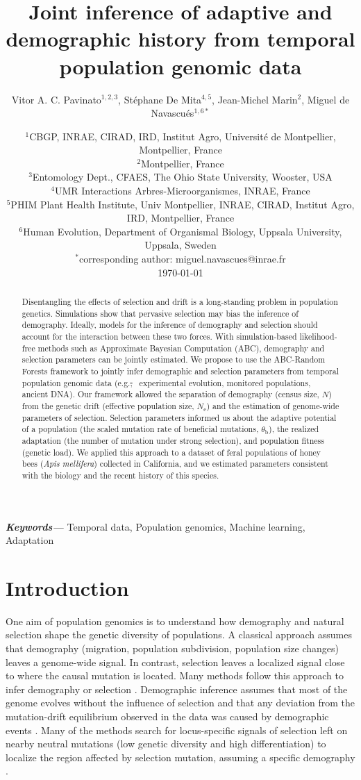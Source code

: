 \documentclass[a4paper, 12pt]{article}
\title{Joint inference of adaptive and demographic history from temporal population genomic data}
\author{\small
            Vitor A. C. Pavinato$^{1,2,3}$, Stéphane De Mita$^{4,5}$, Jean-Michel Marin$^{2}$, Miguel de Navascués$^{1,6*}$}
\date{{\footnotesize %
    $^{1}$CBGP, INRAE, CIRAD, IRD, Institut Agro, Université de Montpellier, Montpellier, France\\%
    $^{2}$\DIFdelbegin \DIFdel{UMR Institut Montpelliérain Alexander Grothendieck, Université de }\DIFdelend \DIFaddbegin \DIFadd{IMAG, Univ Montpellier, CNRS, UMR 5149, }\DIFaddend Montpellier, France  \\%
    $^{3}$Entomology Dept., CFAES, The Ohio State University, Wooster, USA\\%
    $^{4}$UMR Interactions Arbres-Microorganismes, INRAE, France \\%
    $^{5}$PHIM Plant Health Institute, Univ Montpellier, INRAE, CIRAD, Institut Agro, IRD, Montpellier, France\\%
    $^{6}$Human Evolution, Department of Organismal Biology, Uppsala University, Uppsala, Sweden\\%
    $^{*}$corresponding author: miguel.navascues@inrae.fr\\[2ex]%
    }
    \footnotesize\today    
}
\providecommand{\keywords}[1]
{
  \small	
  \textbf{\textit{Keywords---}} #1
}
\providecommand{\DIFdeltex}[1]{{\protect\color{red}\sout{#1}}}                      %
\providecommand{\DIFdelbegin}{} %
\providecommand{\DIFdelend}{} %
\providecommand{\DIFdel}[1]{\texorpdfstring{\DIFdeltex{#1}}{}} %
\newcommand{\DIFscaledelfig}{0.5}
\newlength{\DIFdelgraphicswidth} %
\newlength{\DIFdelgraphicsheight} %
\newcommand{\DIFdelincludegraphics}[2][]{%
\sbox{\DIFdelgraphicsbox}{\DIFOincludegraphics[#1]{#2}}%
\settoboxwidth{\DIFdelgraphicswidth}{\DIFdelgraphicsbox} %
\settoboxtotalheight{\DIFdelgraphicsheight}{\DIFdelgraphicsbox} %
\scalebox{\DIFscaledelfig}{%
\parbox[b]{\DIFdelgraphicswidth}{\usebox{\DIFdelgraphicsbox}\\[-\baselineskip] \rule{\DIFdelgraphicswidth}{0em}}\llap{\resizebox{\DIFdelgraphicswidth}{\DIFdelgraphicsheight}{%
\setlength{\unitlength}{\DIFdelgraphicswidth}%
\begin{picture}(1,1)%
\thicklines\linethickness{2pt} %
{\color[rgb]{1,0,0}\put(0,0){\framebox(1,1){}}}%
{\color[rgb]{1,0,0}\put(0,0){\line( 1,1){1}}}%
{\color[rgb]{1,0,0}\put(0,1){\line(1,-1){1}}}%
\end{picture}%
}\hspace*{3pt}}} %
} %
\DeclareRobustCommand{\DIFdelbegin}{\DIFOdelbegin \let\includegraphics\DIFdelincludegraphics} %
\DeclareRobustCommand{\DIFdelend}{\DIFOaddend \let\includegraphics\DIFOincludegraphics} %
\begin{document}
\maketitle

\begin{abstract}
Disentangling the effects of selection and drift is a long-standing problem in population genetics. Simulations show that pervasive selection may bias the inference of demography. Ideally, models for the inference of demography and selection should account for the interaction between these two forces. With simulation-based likelihood-free methods such as Approximate Bayesian Computation (ABC), demography and selection parameters can be jointly estimated. We propose to use the ABC-Random Forests framework to jointly infer demographic  and selection parameters from temporal population genomic data (e.g.\DIFdelbegin \DIFdel{, }\DIFdelend \ experimental evolution, monitored populations, ancient DNA). Our framework allowed the separation of demography (census size, $N$) from the genetic drift (effective population size, $N_{\mathrm{e}}$) and the estimation of genome-wide parameters of selection. Selection parameters informed us about the adaptive potential of a population (the scaled mutation rate of beneficial mutations, $\theta_{\mathrm{b}}$), the realized adaptation (the number of mutation under strong selection), and population fitness (genetic load). We applied this approach to a dataset of feral populations of honey bees (\textit{Apis mellifera}) collected in California, and we estimated parameters consistent with the biology and the recent history of this species.
\end{abstract}\hspace{12pt}

\keywords{Temporal data, Population genomics, Machine learning, Adaptation}

\newpage

\section*{Introduction}

One aim of population genomics is to understand how demography and natural selection shape the genetic diversity of populations. A classical approach assumes that demography (migration, population subdivision, population size changes) leaves a genome-wide signal. In contrast, selection leaves a localized signal close to where the causal mutation is located. Many methods follow this approach to infer demography or selection \citep[reviewed by][]{Beichman:2018bx, Casillas:2017jv}. Demographic inference assumes that most of the genome evolves without the influence of selection and that any deviation from the mutation-drift equilibrium observed in the data was caused by demographic events \citep{Beichman:2018bx}. Many of the methods search for locus-specific signals of selection left on nearby neutral mutations \citep{Tajima:1989un, Fay:2000dl, Kim:2004ih} (low genetic diversity and high differentiation) to localize the region affected by selection mutation, assuming a specific demography \citep[constant population size in early methods;][]{Nielsen:2005kx, Pool:2010eh}.
\end{document}
